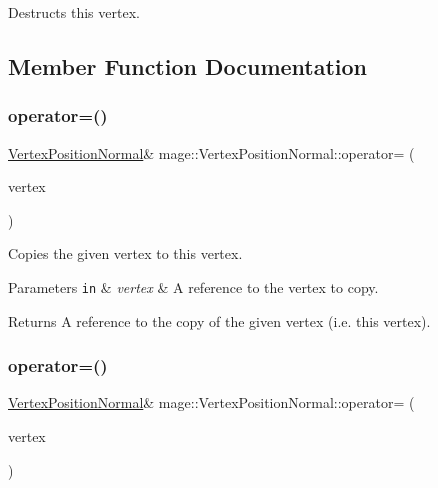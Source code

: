 Destructs this vertex. 

\subsection{Member Function Documentation}
\hypertarget{structmage_1_1_vertex_position_normal_a43c666c745b5807afddf87049ace0ef1}{}\label{structmage_1_1_vertex_position_normal_a43c666c745b5807afddf87049ace0ef1} 
\subsubsection{\texorpdfstring{operator=()}{operator=()}\hspace{0.1cm}{\footnotesize\ttfamily [1/2]}}
{\footnotesize\ttfamily \hyperlink{structmage_1_1_vertex_position_normal}{Vertex\+Position\+Normal}\& mage\+::\+Vertex\+Position\+Normal\+::operator= (\begin{DoxyParamCaption}\item[{const \hyperlink{structmage_1_1_vertex_position_normal}{Vertex\+Position\+Normal} \&}]{vertex }\end{DoxyParamCaption})\hspace{0.3cm}{\ttfamily [default]}}

Copies the given vertex to this vertex.


\begin{DoxyParams}[1]{Parameters}
\mbox{\tt in}  & {\em vertex} & A reference to the vertex to copy. \\
\hline
\end{DoxyParams}
\begin{DoxyReturn}{Returns}
A reference to the copy of the given vertex (i.\+e. this vertex). 
\end{DoxyReturn}
\hypertarget{structmage_1_1_vertex_position_normal_acd4c5c78fba38ea8ea61f8d508ce10a3}{}\label{structmage_1_1_vertex_position_normal_acd4c5c78fba38ea8ea61f8d508ce10a3} 
\subsubsection{\texorpdfstring{operator=()}{operator=()}\hspace{0.1cm}{\footnotesize\ttfamily [2/2]}}
{\footnotesize\ttfamily \hyperlink{structmage_1_1_vertex_position_normal}{Vertex\+Position\+Normal}\& mage\+::\+Vertex\+Position\+Normal\+::operator= (\begin{DoxyParamCaption}\item[{\hyperlink{structmage_1_1_vertex_position_normal}{Vertex\+Position\+Normal} \&\&}]{vertex }\end{DoxyParamCaption})\hspace{0.3cm}{\ttfamily [default]}}

